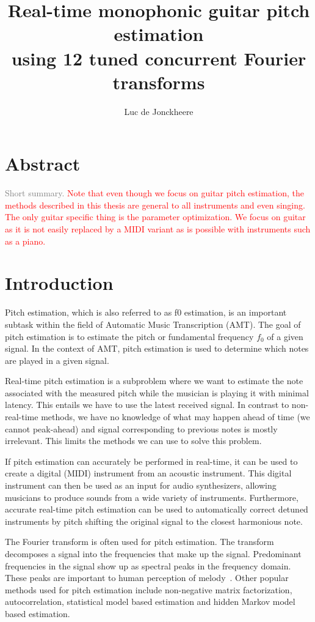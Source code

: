 \documentclass[10pt,twocolumn]{article}
\title{\textbf{Real-time monophonic guitar pitch estimation\\using 12 tuned concurrent Fourier transforms}}
\author{Luc de Jonckheere}
\begin{document}

\maketitle


\section*{Abstract}
\textcolor{gray}{Short summary.}
\textcolor{red}{Note that even though we focus on guitar pitch estimation, the methods described in this thesis are general to all instruments and even singing. The only guitar specific thing is the parameter optimization. We focus on guitar as it is not easily replaced by a MIDI variant as is possible with instruments such as a piano.}


\tableofcontents


\section{Introduction}
Pitch estimation, which is also referred to as f0 estimation, is an important subtask within the field of Automatic Music Transcription (AMT). The goal of pitch estimation is to estimate the pitch or fundamental frequency $f_0$ of a given signal. In the context of AMT, pitch estimation is used to determine which notes are played in a given signal.

Real-time pitch estimation is a subproblem where we want to estimate the note associated with the measured pitch while the musician is playing it with minimal latency. This entails we have to use the latest received signal. In contrast to non-real-time methods, we have no knowledge of what may happen ahead of time (we cannot peak-ahead) and signal corresponding to previous notes is mostly irrelevant. This limits the methods we can use to solve this problem.

If pitch estimation can accurately be performed in real-time, it can be used to create a digital (MIDI) instrument from an acoustic instrument. This digital instrument can then be used as an input for audio synthesizers, allowing musicians to produce sounds from a wide variety of instruments. Furthermore, accurate real-time pitch estimation can be used to automatically correct detuned instruments by pitch shifting the original signal to the closest harmonious note.

The Fourier transform is often used for pitch estimation. The transform decomposes a signal into the frequencies that make up the signal. Predominant frequencies in the signal show up as spectral peaks in the frequency domain. These peaks are important to human perception of melody~\cite{hearing}. %
Other popular methods used for pitch estimation include non-negative matrix factorization, autocorrelation, statistical model based estimation and hidden Markov model based estimation.
\end{document}
